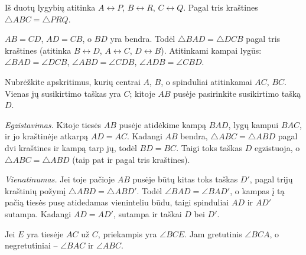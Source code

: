 \documentclass[12pt,a4paper,reqno]{amsart}
\theoremstyle{plain}\newtheorem{theorem}{Teorema}[section]
\theoremstyle{definition}
\theoremstyle{remark}\newtheorem{remark}[theorem]{Pastaba}\newtheorem*{remark*}{Pastaba}
\theoremstyle{definition}\newtheorem*{problem*}{Uždavinys}
\begin{document}
\begin{solution}[\ref{uzd:sss-tiesioginis-01}] Iš duotų lygybių atitinka $A\leftrightarrow P$, $B\leftrightarrow R$, $C\leftrightarrow Q$. Pagal tris kraštines $\triangle ABC=\triangle PRQ$. \end{solution}
\begin{solution}[\ref{uzd:sss-tiesioginis-02}] $AB=CD$, $AD=CB$, o $BD$ yra bendra. Todėl $\triangle BAD=\triangle DCB$ pagal tris kraštines (atitinka $B\leftrightarrow D$, $A\leftrightarrow C$, $D\leftrightarrow B$). Atitinkami kampai lygūs: $\angle BAD=\angle DCB$, $\angle ABD=\angle CDB$, $\angle ADB=\angle CBD$. \end{solution}
\begin{solution}[\ref{uzd:sss-konstr-01}] Nubrėžkite apskritimus, kurių centrai $A$, $B$, o spinduliai atitinkamai $AC$, $BC$. Vienas jų susikirtimo taškas yra $C$; kitoje $AB$ pusėje pasirinkite susikirtimo tašką $D$.\par
\emph{Egzistavimas.} Kitoje tiesės $AB$ pusėje atidėkime kampą $BAD$, lygų kampui $BAC$, ir jo kraštinėje atkarpą $AD=AC$. Kadangi $AB$ bendra, $\triangle ABC=\triangle ABD$ pagal dvi kraštines ir kampą tarp jų, todėl $BD=BC$. Taigi toks taškas $D$ egzistuoja, o $\triangle ABC=\triangle ABD$ (taip pat ir pagal tris kraštines).\par
\emph{Vienatinumas.} Jei toje pačioje $AB$ pusėje būtų kitas toks taškas $D'$, pagal trijų kraštinių požymį $\triangle ABD=\triangle ABD'$. Todėl $\angle BAD=\angle BAD'$, o kampas į tą pačią tiesės pusę atidedamas vieninteliu būdu, taigi spinduliai $AD$ ir $AD'$ sutampa. Kadangi $AD=AD'$, sutampa ir taškai $D$ bei $D'$. \end{solution}
\begin{solution}[\ref{uzd:priekampis-supratimas}] Jei $E$ yra tiesėje $AC$ už $C$, priekampis yra $\angle BCE$. Jam gretutinis $\angle BCA$, o negretutiniai – $\angle BAC$ ir $\angle ABC$. \end{solution}
\end{document}
